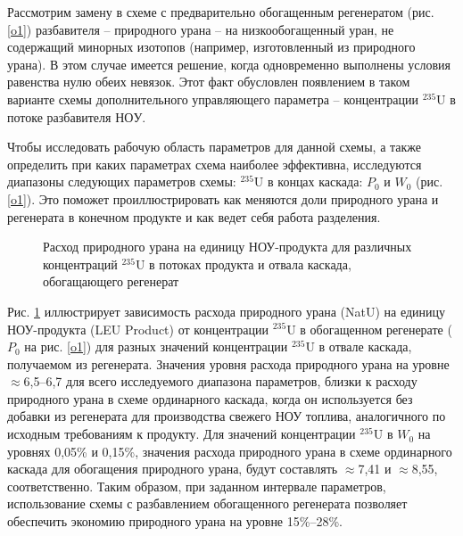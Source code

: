 Рассмотрим замену в схеме с предварительно обогащенным регенератом (рис. \ref{o1}) разбавителя -- природного урана -- на низкообогащенный уран, не содержащий минорных изотопов (например, изготовленный из природного урана). В этом случае имеется решение, когда одновременно выполнены условия равенства нулю обеих невязок. Этот факт обусловлен появлением в таком варианте схемы дополнительного управляющего параметра -- концентрации $^{235}$U в потоке разбавителя $НОУ$.

Чтобы исследовать рабочую область параметров для данной схемы, а также определить при каких параметрах схема наиболее эффективна, исследуются диапазоны следующих параметров схемы: $^{235}$U в концах каскада: $P_0$ и $W_0$ (рис. \ref{o1}). Это поможет проиллюстрировать как меняются доли природного урана и регенерата в конечном продукте и как ведет себя работа разделения.

\begin{figure}[ht]
  \caption{Расход природного урана на единицу НОУ-продукта  для различных концентраций $^{235}$U в потоках продукта и отвала каскада, обогащающего регенерат}\label{fig:sc2_2}
\end{figure}

Рис. \ref{fig:sc2_2} иллюстрирует зависимость расхода природного урана (NatU) на единицу НОУ-продукта (LEU Product) от концентрации $^{235}$U в обогащенном регенерате ($P_0$ на рис. \ref{o1}) для разных значений концентрации $^{235}$U в отвале каскада, получаемом из регенерата. Значения уровня расхода природного урана на уровне $\approx$6,5--6,7 для всего исследуемого диапазона параметров, близки к расходу природного урана в схеме ординарного каскада, когда он используется без добавки из регенерата для производства свежего НОУ топлива, аналогичного по исходным требованиям к продукту. Для значений концентрации $^{235}$U в $W_0$ на уровнях 0,05\% и 0,15\%, значения расхода природного урана в схеме ординарного каскада для обогащения природного урана, будут составлять $\approx$7,41 и $\approx$8,55, соответственно. Таким образом, при заданном интервале параметров, использование схемы с разбавлением обогащенного регенерата позволяет обеспечить экономию природного урана на уровне 15\%--28\%.

